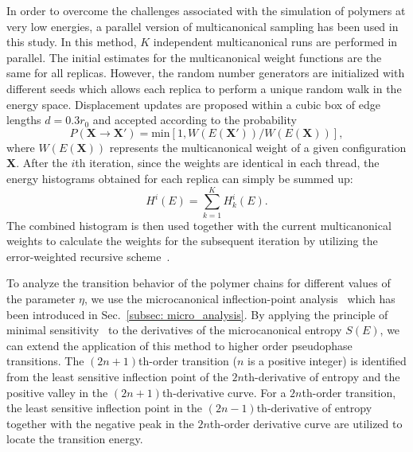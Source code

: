 \documentclass[12pt]{report}
\begin{document}
\newpage
In order to overcome the challenges associated with the simulation of polymers at very low energies, a parallel version of multicanonical sampling \cite{muca1a,muca2,Zierenberg2013} has been used in this study. In this method, $K$ independent multicanonical runs are performed in parallel. The initial estimates for the multicanonical weight functions are the same for all replicas. However, the random number generators are initialized with different seeds which allows each replica to perform a unique random walk in the energy space. Displacement updates are proposed within a cubic box of edge lengths $d=0.3r_0$ and accepted according to the probability
%
\begin{equation}
P(\mathbf{{X}} \rightarrow \mathbf{X}')= \mathrm{min}[1,W(E( \mathbf{X}'))/W(E( \mathbf{X}))],
\end{equation}
%
where $W(E( \mathbf{X}))$ represents the multicanonical weight of a given configuration $ \mathbf{X}$. After the $i$th iteration, since the weights are identical in each thread, the energy histograms obtained for each replica can simply be summed up:
%
\begin{equation}
    H^i(E)=\sum^K_{k=1}H^i_k(E). 
\end{equation}
%
The combined histogram is then used together with the current multicanonical weights to calculate the weights for the subsequent iteration by utilizing the error-weighted recursive
scheme~\cite{Bachmann2014,muca1a,muca2}. 

To analyze the transition behavior of the polymer chains for different values of the parameter $\eta$, we use the microcanonical inflection-point analysis~\cite{Bachmann2014,Schnabel2011} which has been introduced in Sec.~\ref{subsec: micro_analysis}. By applying the principle of minimal sensitivity~\cite{Stevenson} to the derivatives of the microcanonical entropy $S(E)$, we can extend the application of this method to higher order pseudophase transitions. The $(2n+1)$th-order transition ($n$ is a positive integer) is identified from the least sensitive inflection point of the $2n$th-derivative of entropy and the positive valley in the $(2n+1)$th-derivative curve. For a $2n$th-order transition, the least sensitive inflection point in the $(2n-1)$th-derivative of entropy together with the negative peak in the $2n$th-order derivative curve are utilized to locate the transition energy. 
%
\end{document}
